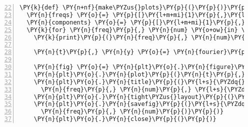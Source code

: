 \begin{Verbatim}[commandchars=\\\{\},numbers=left,numbersep=0.5em,firstnumber=22]
\PY{k}{def} \PY{n+nf}{make\PYZus{}plots}\PY{p}{(}\PY{p}{)}\PY{p}{:}
  \PY{n}{freqs} \PY{o}{=} \PY{p}{[}\PY{l+m+mi}{1}\PY{p}{,}\PY{l+m+mi}{2}\PY{p}{,}\PY{l+m+mi}{3}\PY{p}{,}\PY{l+m+mi}{4}\PY{p}{,}\PY{l+m+mi}{5}\PY{p}{]}
  \PY{n}{components} \PY{o}{=} \PY{p}{[}\PY{l+m+mi}{1}\PY{p}{,}\PY{l+m+mi}{3}\PY{p}{,}\PY{l+m+mi}{5}\PY{p}{,}\PY{l+m+mi}{7}\PY{p}{,}\PY{l+m+mi}{9}\PY{p}{]}
  \PY{k}{for} \PY{n}{freq}\PY{p}{,} \PY{n}{num} \PY{o+ow}{in} \PY{n}{product}\PY{p}{(}\PY{n}{freqs}\PY{p}{,} \PY{n+nb}{range}\PY{p}{(}\PY{l+m+mi}{1}\PY{p}{,}\PY{l+m+mi}{6}\PY{p}{)}\PY{p}{)}\PY{p}{:}
    \PY{k}{print}\PY{p}{(}\PY{n}{freq}\PY{p}{,} \PY{n}{num}\PY{p}{)}
    
    \PY{n}{t}\PY{p}{,} \PY{n}{y} \PY{o}{=} \PY{n}{fourier}\PY{p}{(}\PY{n}{freq}\PY{p}{,} \PY{n}{components}\PY{p}{[}\PY{p}{:}\PY{n}{num}\PY{p}{]}\PY{p}{)}
    
    \PY{n}{fig} \PY{o}{=} \PY{n}{plt}\PY{o}{.}\PY{n}{figure}\PY{p}{(}\PY{n}{figsize}\PY{o}{=}\PY{p}{[}\PY{l+m+mi}{3}\PY{p}{,}\PY{l+m+mi}{2}\PY{p}{]}\PY{p}{)}
    \PY{n}{plt}\PY{o}{.}\PY{n}{plot}\PY{p}{(}\PY{n}{t}\PY{p}{,} \PY{n}{y}\PY{p}{,} \PY{n}{c}\PY{o}{=}\PY{p}{[}\PY{o}{.}\PY{l+m+mi}{3}\PY{p}{,}\PY{o}{.}\PY{l+m+mi}{5}\PY{p}{,}\PY{l+m+mi}{1}\PY{p}{]}\PY{p}{,} \PY{n}{lw}\PY{o}{=}\PY{l+m+mf}{2.5}\PY{p}{)}
    \PY{n}{plt}\PY{o}{.}\PY{n}{title}\PY{p}{(}\PY{l+s}{\PYZdq{}}\PY{l+s}{\PYZob{}\PYZcb{} Hz, \PYZob{}\PYZcb{} Component\PYZob{}\PYZcb{}}\PY{l+s}{\PYZdq{}}\PY{o}{.}\PY{n}{format}\PY{p}{(}
      \PY{n}{freq}\PY{p}{,} \PY{n}{num}\PY{p}{,} \PY{l+s}{\PYZdq{}}\PY{l+s}{\PYZdq{}} \PY{k}{if} \PY{n}{num} \PY{o}{==} \PY{l+m+mi}{1} \PY{k}{else} \PY{l+s}{\PYZdq{}}\PY{l+s}{s}\PY{l+s}{\PYZdq{}}\PY{p}{)}\PY{p}{)}
    \PY{n}{plt}\PY{o}{.}\PY{n}{tight\PYZus{}layout}\PY{p}{(}\PY{p}{)}
    \PY{n}{plt}\PY{o}{.}\PY{n}{savefig}\PY{p}{(}\PY{l+s}{\PYZdq{}}\PY{l+s}{../img/fouriers/\PYZob{}\PYZcb{}\PYZus{}\PYZob{}\PYZcb{}.pdf}\PY{l+s}{\PYZdq{}}\PY{o}{.}\PY{n}{format}\PY{p}{(}
      \PY{n}{freq}\PY{p}{,} \PY{n}{num}\PY{p}{)}\PY{p}{)}
    \PY{n}{plt}\PY{o}{.}\PY{n}{close}\PY{p}{(}\PY{p}{)}
\end{Verbatim}
